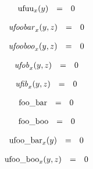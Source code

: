 $$
\begin{array}{@{}lcl@{}l@{}}
{{\mathrm{ufuu}}}_{x}(y) &=& 0 \\
\end{array}
$$

$$
\begin{array}{@{}lcl@{}l@{}}
{{\mathit{ufoobar}}}_{x}(y, z) &=& 0 \\
\end{array}
$$

$$
\begin{array}{@{}lcl@{}l@{}}
{{\mathit{ufooboo}}}_{x}(y, z) &=& 0 \\
\end{array}
$$

$$
\begin{array}{@{}lcl@{}l@{}}
{{\mathit{ufob}}}_{x}(y, z) &=& 0 \\
\end{array}
$$

$$
\begin{array}{@{}lcl@{}l@{}}
{{\mathit{ufib}}}_{x}(y, z) &=& 0 \\
\end{array}
$$

$$
\begin{array}{@{}lcl@{}l@{}}
{\mathrm{foo\_bar}} &=& 0 \\
\end{array}
$$

$$
\begin{array}{@{}lcl@{}l@{}}
{\mathrm{foo\_boo}} &=& 0 \\
\end{array}
$$

$$
\begin{array}{@{}lcl@{}l@{}}
{{\mathrm{ufoo\_bar}}}_{x}(y) &=& 0 \\
\end{array}
$$

$$
\begin{array}{@{}lcl@{}l@{}}
{{\mathrm{ufoo\_boo}}}_{x}(y, z) &=& 0 \\
\end{array}
$$

\vspace{1ex}

